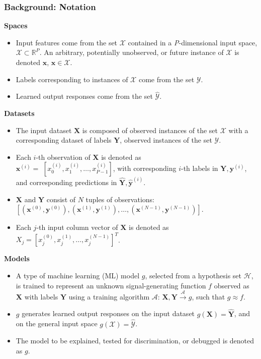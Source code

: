 \begin{frame}[allowframebreaks]

	\frametitle{Background: Notation}
	
	\textbf{Spaces} 
	
	\begin{itemize}
		\item Input features come from the set $\mathcal{X}$ contained in a \textit{P}-dimensional input space, $\mathcal{X} \subset \mathbb{R}^P$.  An arbitrary, potentially unobserved, or future instance of $\mathcal{X}$ is denoted $\mathbf{x}$, $\mathbf{x} \in \mathcal{X}$.
		\item Labels corresponding to instances of $\mathcal{X}$ come from the set $\mathcal{Y}$.
		\item Learned output responses come from the set $\mathcal{\hat{Y}}$.
	\end{itemize}	
	
	\framebreak	
	
	\textbf{Datasets} 
	
	\begin{itemize}
		\item The input dataset $\mathbf{X}$ is composed of observed instances of the set $\mathcal{X}$ with a corresponding dataset of labels $\mathbf{Y}$, observed instances of the set $\mathcal{Y}$. 
		\item Each $i$-th observation of $\mathbf{X}$ is denoted as\\ $\mathbf{x}^{(i)} = $  
		$[x_0^{(i)}, x_1^{(i)}, \dots, x_{\textit{P}-1}^{(i)}]$, with corresponding $i$-th labels in $\mathbf{Y}, \mathbf{y}^{(i)}$, and corresponding predictions in $\mathbf{\hat{Y}}, \mathbf{\hat{y}}^{(i)}$.
		\item $\mathbf{X}$ and $\mathbf{Y}$ consist of $N$ tuples of observations:\\ $[(\mathbf{x}^{(0)},\mathbf{y}^{(0)}), (\mathbf{x}^{(1)},\mathbf{y}^{(1)}), \dots,(\mathbf{x}^{(N-1)},\mathbf{y}^{(N-1)})]$.
		\item Each $j$-th input column vector of $\mathbf{X}$ is denoted as $X_j = [x_{j}^{(0)}, x_{j}^{(1)}, \dots, x_{j}^{(N-1)}]^T$.
	\end{itemize}	 
	
	\framebreak
	
	\textbf{Models}
	
	\begin{itemize}
		\item A type of machine learning (ML) model $g$, selected from a hypothesis set $\mathcal{H}$, is trained to represent an unknown signal-generating function $f$ observed as  $\mathbf{X}$ with labels $\mathbf{Y}$ using a training algorithm $\mathcal{A}$: 
		$ \mathbf{X}, \mathbf{Y} \xrightarrow{\mathcal{A}} g$, such that $g \approx f$.
		\item $g$ generates learned output responses on the input dataset $g(\mathbf{X}) = \mathbf{\hat{Y}}$, and on the general input space $g(\mathcal{X}) = \mathcal{\hat{Y}}$.
		\item The model to be explained, tested for discrimination, or debugged is denoted as $g$.
	\end{itemize}
	
\end{frame}
